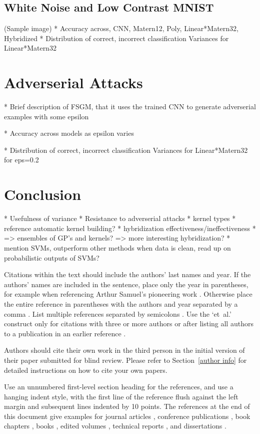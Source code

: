 \documentclass{article}
\begin{document}
\subsection{White Noise and Low Contrast MNIST}
 (Sample image)
* Accuracy across, CNN, Matern12, Poly, Linear*Matern32, Hybridized
* Distribution of correct, incorrect classification Variances for Linear*Matern32



\section{Adverserial Attacks}
* Brief description of FSGM, that it uses the trained CNN to generate adverserial examples with some epsilon

* Accuracy across models as epsilon varies

* Distribution of correct, incorrect classification Variances for Linear*Matern32 for eps=0.2

\section{Conclusion}
* Usefulness of variance
* Resistance to adverserial attacks
* kernel types
* reference automatic kernel building?
* hybridization effectiveness/ineffectiveness
* => ensembles of GP's and kernels? => more interesting hybridization?
* mention SVMs, outperform other methods when data is clean, read up on probabilistic outputs of SVMs?



Citations within the text should include the authors' last names and
year. If the authors' names are included in the sentence, place only
the year in parentheses, for example when referencing Arthur Samuel's
pioneering work . Otherwise place the entire
reference in parentheses with the authors and year separated by a
comma \cite{Samuel59}. List multiple references separated by
semicolons \cite{kearns89,Samuel59,mitchell80}. Use the `et~al.'
construct only for citations with three or more authors or after
listing all authors to a publication in an earlier reference \cite{MachineLearningI}.

Authors should cite their own work in the third person
in the initial version of their paper submitted for blind review.
Please refer to Section~\ref{author info} for detailed instructions on how to
cite your own papers.

Use an unnumbered first-level section heading for the references, and use a
hanging indent style, with the first line of the reference flush against the
left margin and subsequent lines indented by 10 points. The references at the
end of this document give examples for journal articles \cite{Samuel59},
conference publications \cite{langley00}, book chapters \cite{Newell81}, books
\cite{DudaHart2nd}, edited volumes \cite{MachineLearningI}, technical reports
\cite{mitchell80}, and dissertations \cite{kearns89}.
\end{document}
